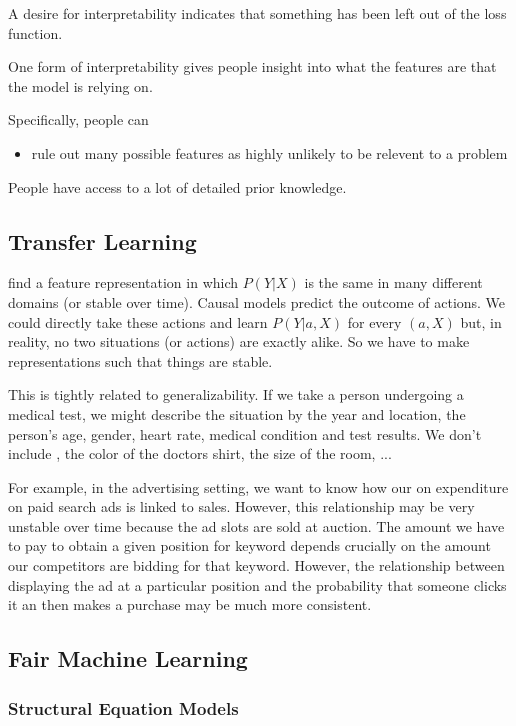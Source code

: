 \documentclass[11pt,a4paper]{book}
\begin{document}
A desire for interpretability indicates that something has been left out of the loss function. 

One form of interpretability gives people insight into what the features are that the model is relying on.

Specifically, people can
\begin{itemize}
\item rule out many possible features as highly unlikely to be relevent to a problem
\end{itemize}

People have access to a lot of detailed prior knowledge.  
\subsection*{Transfer Learning}
find a feature representation in which $P(Y|X)$ is the same in many different domains (or stable over time). Causal models predict the outcome of actions. We could directly take these actions and learn $P(Y|a,X)$ for every $(a,X)$ but, in reality, no two situations (or actions) are exactly alike. So we have to make representations such that things are stable. 

This is tightly related to generalizability. If we take a person undergoing a medical test, we might describe the situation by the year and location, the person's age, gender, heart rate, medical condition and test results. We don't include , the color of the doctors shirt, the size of the room, ...

For example, in the advertising setting, we want to know how our on expenditure on paid search ads is linked to sales. However, this relationship may be very unstable over time because the ad slots are sold at auction. The amount we have to pay to obtain a given position for keyword depends crucially on the amount our competitors are bidding for that keyword. However, the relationship between displaying the ad at a particular position and the probability that someone clicks it an then makes a purchase may be much more consistent. 
\subsection*{Fair Machine Learning}





\subsubsection*{Structural Equation Models}
\end{document}
